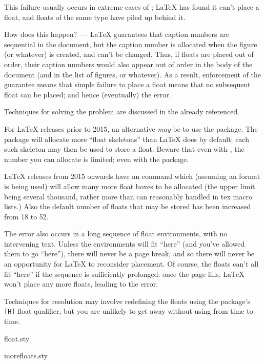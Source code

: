 This failure usually occurs in extreme cases of %
;
\LaTeX{} has found it can't place a float, and floats of the same type
have piled up behind it.

How does this happen?~--- \LaTeX{} guarantees that caption numbers are
sequential in the document, but the caption number is allocated when
the figure (or whatever) is created, and can't be changed.  Thus, if
floats are placed out of order, their caption numbers would also
appear out of order in the body of the document (and in the list of
figures, or whatever).  As a result, enforcement of the guarantee
means that simple failure to place a float means that no subsequent
float can be placed; and hence (eventually) the error.

Techniques for solving the problem are discussed in the %
 already referenced.

For \LaTeX{} releases prior to 2015, an
 alternative \emph{may} be to use the  package.
The package will allocate more ``float skeletons'' than \LaTeX{}
does by default; each such skeleton may then be used to store a
float.  Beware that even with , the number you can
allocate is limited; even with the  package.

\LaTeX{} releases from 2015 onwards have an 
command which (assuming an \eTeX{} format is being used) will
allow many more float boxes to be allocated (the upper limit 
being several thousand, rather more than can reasonably handled
in tex macro lists.) Also the default number of floats that may be stored
has been increased from 18 to 52.

The error also occurs in a long sequence of float environments, with
no intervening text.  Unless the environments will fit ``here'' (and
you've allowed them to go ``here''), there will never be a page break,
and so there will never be an opportunity for \LaTeX{} to reconsider
placement.  Of course, the floats can't all fit ``here'' if the
sequence is sufficiently prolonged: once the page fills, \LaTeX{}
won't place any more floats, leading to the error.

Techniques for resolution may involve redefining the floats using the
 package's \texttt{[H]} float qualifier, but you are unlikely
to get away without using  from time to time.
\begin{ctanrefs}
\item[float.sty]
\item[morefloats.sty]
\end{ctanrefs}

